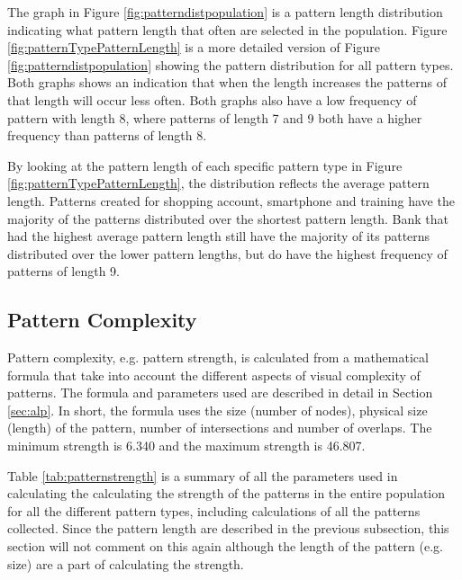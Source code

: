     \clearpage

    The graph in Figure \ref{fig:patterndistpopulation} is a pattern length distribution indicating what pattern length that often are selected in the population. Figure \ref{fig:patternTypePatternLength} is a more detailed version of Figure \ref{fig:patterndistpopulation} showing the pattern distribution for all pattern types. Both graphs shows an indication that when the length increases the patterns of that length will occur less often. Both graphs also have a low frequency of pattern with length 8, where patterns of length 7 and 9 both have a higher frequency than patterns of length 8.

    By looking at the pattern length of each specific pattern type in Figure \ref{fig:patternTypePatternLength}, the distribution reflects the average pattern length. Patterns created for shopping account, smartphone and training have the majority of the patterns distributed over the shortest pattern length. Bank that had the highest average pattern length still have the majority of its patterns distributed over the lower pattern lengths, but do have the highest frequency of patterns of length 9. 

	\subsection{Pattern Complexity}

    Pattern complexity, e.g. pattern strength, is calculated from a mathematical formula that take into account the different aspects of visual complexity of patterns. The formula and parameters used are described in detail in Section \ref{sec:alp}. In short, the formula uses the size (number of nodes), physical size (length) of the pattern, number of intersections and number of overlaps. The minimum strength is 6.340 and the maximum strength is 46.807.

    Table \ref{tab:patternstrength} is a summary of all the parameters used in calculating the calculating the strength of the patterns in the entire population for all the different pattern types, including calculations of all the patterns collected. Since the pattern length are described in the previous subsection, this section will not comment on this again although the length of the pattern (e.g. size) are a part of calculating the strength. 

